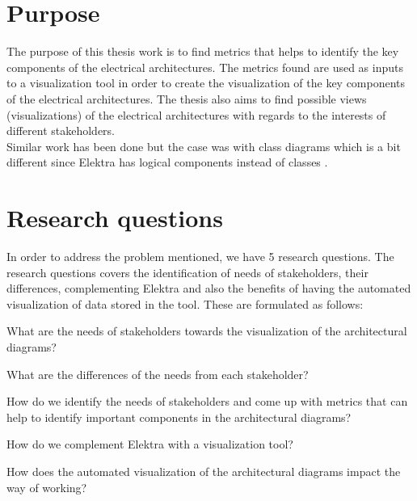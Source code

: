 \section{Purpose} \label{Purpose_ref}
The purpose of this thesis work is to find metrics that helps to identify the key components of the electrical architectures. The metrics found are used as inputs to a visualization tool in order to create the visualization of the key components of the electrical architectures. The thesis also aims to find possible views (visualizations) of the electrical architectures with regards to the interests of different stakeholders. \\

Similar work has been done but the case was with class diagrams which is a bit different since Elektra has logical components instead of classes .

\section{Research questions} \label{RQ_ref}
In order to address the problem mentioned, we have 5 research questions. The research questions covers the identification of needs of stakeholders, their differences, complementing Elektra and also the benefits of having the automated visualization of data stored in the tool. These are formulated as follows:

\begin{que} \label{que:1}
What are the needs of stakeholders towards the visualization of the architectural diagrams?
\end{que}

\begin{que} \label{que:2}
What are the differences of the needs from each stakeholder?
\end{que}

\begin{que} \label{que:3}
How do we identify the needs of stakeholders and come up with metrics that can help to identify important components in the architectural diagrams?
\end{que}

\begin{que}\label{que:4}
How do we complement Elektra with a visualization tool?
\end{que}

\begin{que} \label{que:5}
How does the automated visualization of the architectural diagrams impact the way of working?
\end{que}


